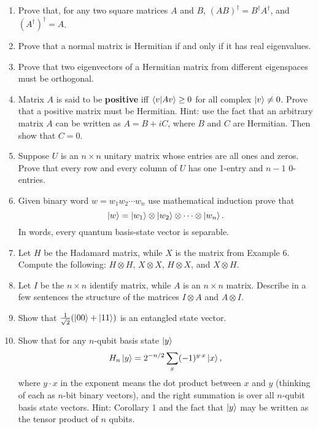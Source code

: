 \documentclass [12pt]{article}
\theoremstyle{definition}
\begin{document}
\begin{enumerate}
\item Prove that, for any two square matrices $A$ and $B$, $(AB)^{\dagger} = B^{\dagger}A^{\dagger}$, and $(A^{\dagger})^{\dagger} = A$.

\item Prove that a normal matrix is Hermitian if and only if it has real eigenvalues.

\item Prove that two eigenvectors of a Hermitian matrix from different eigenspaces must be orthogonal.

\item Matrix $A$ is said to be \textbf{positive} iff $\braket{v|Av}\geq 0$ for all complex $\ket{v}\not=0$. Prove that a positive matrix must be Hermitian.
Hint: use the fact that an arbitrary matrix $A$ can be written as $A=B+iC$, where  $B$ and $C$ are Hermitian. Then show that $C=0$.










\item Suppose $U$ is an $n\times n$ unitary matrix whose entries are all ones and zeros. Prove that every row and every column of $U$ has one 1-entry and $n-1$ 0-entries.

\item Given binary word $w=w_1w_2\cdots w_n$ use mathematical induction prove that
\[\ket{w}=\ket{w_1}\otimes \ket{w_2}\otimes \cdots \otimes \ket{w_n}.\]
In words, every  quantum basis-state vector is separable.

\item Let $H$ be the Hadamard matrix, while $X$ is the matrix from Example  6. Compute the following: $H\otimes H$, $X\otimes X$, $H\otimes X$, and $X\otimes H$.

\item Let $I$ be the $n\times n$ identify matrix, while $A$ is an $n\times n$ matrix. Describe in a few sentences the structure of the
 matrices $I\otimes A$ and $A\otimes I$.




\item Show that $\frac{1}{\sqrt{2}}(\ket{00} + \ket{11})$ is an entangled state vector. 




\item 
\label{ex:uniform}
Show that for any $n$-qubit basis state $\ket{y}$
\[H_n\ket{y} = 2^{-n/2}\sum_{x}(-1)^{y\cdot x}\ket{x},\]
where $y\cdot x$ in the exponent means the dot product between $x$ and $y$ (thinking of each as $n$-bit binary vectors), 
and the right summation is over all $n$-qubit basis state vectors.
Hint: Corollary 1 and the fact that $\ket{y}$ may be written as the tensor product of $n$ qubits.



\end{enumerate}
\end{document}
